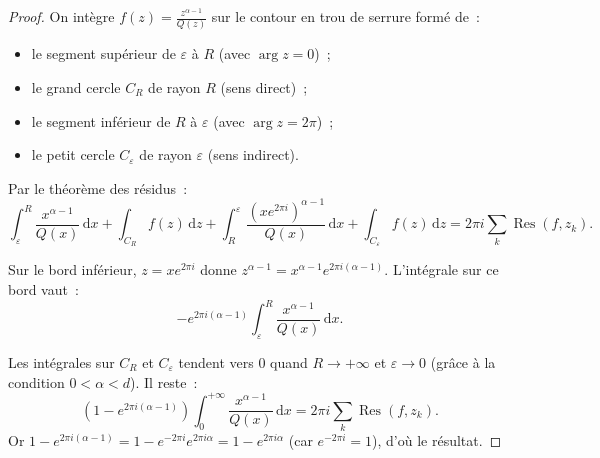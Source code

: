 \documentclass[12pt,a4paper,openany]{book}
\theoremstyle{definition}
\theoremstyle{plain}
\theoremstyle{remark}
\DeclareMathOperator{\Res}{Res}
\newcommand{\dd}{\mathrm{d}}
\begin{document}
\begin{proof}
On intègre $f(z) = \frac{z^{\alpha-1}}{Q(z)}$ sur le contour en trou de serrure
formé de~:
\begin{itemize}
  \item le segment supérieur de $\varepsilon$ à $R$ (avec $\arg z = 0$)~;
  \item le grand cercle $C_R$ de rayon $R$ (sens direct)~;
  \item le segment inférieur de $R$ à $\varepsilon$ (avec $\arg z = 2\pi$)~;
  \item le petit cercle $C_\varepsilon$ de rayon $\varepsilon$ (sens indirect).
\end{itemize}

Par le théorème des résidus~:
\[
  \int_\varepsilon^R \frac{x^{\alpha-1}}{Q(x)}\,\dd x
  + \int_{C_R} f(z)\,\dd z
  + \int_R^\varepsilon \frac{(xe^{2\pi i})^{\alpha-1}}{Q(x)}\,\dd x
  + \int_{C_\varepsilon} f(z)\,\dd z
  = 2\pi i \sum_k \Res(f, z_k).
\]

Sur le bord inférieur, $z = xe^{2\pi i}$ donne $z^{\alpha-1} = x^{\alpha-1} e^{2\pi i(\alpha-1)}$.
L'intégrale sur ce bord vaut~:
\[
  -e^{2\pi i(\alpha-1)} \int_\varepsilon^R \frac{x^{\alpha-1}}{Q(x)}\,\dd x.
\]

Les intégrales sur $C_R$ et $C_\varepsilon$ tendent vers $0$ quand $R \to +\infty$
et $\varepsilon \to 0$ (grâce à la condition $0 < \alpha < d$). Il reste~:
\[
  (1 - e^{2\pi i(\alpha-1)}) \int_0^{+\infty} \frac{x^{\alpha-1}}{Q(x)}\,\dd x
  = 2\pi i \sum_k \Res(f, z_k).
\]
Or $1 - e^{2\pi i(\alpha-1)} = 1 - e^{-2\pi i} e^{2\pi i\alpha} = 1 - e^{2\pi i\alpha}$
(car $e^{-2\pi i} = 1$), d'où le résultat.
\end{proof}
\end{document}
